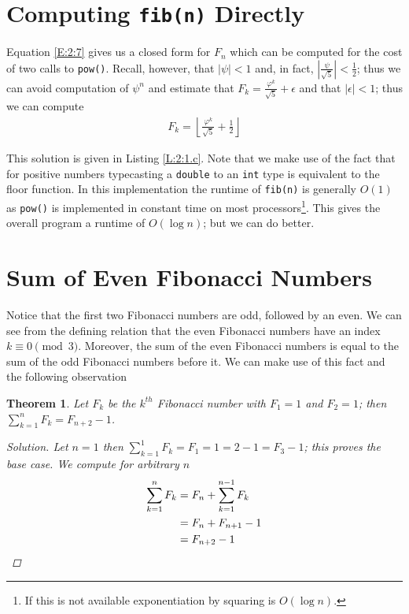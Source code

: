 \documentclass[oneside,12pt]{book}   	%
\newcounter{ex}
\newcounter{def}
\newcounter{pr}
\newtheorem{thm}{Theorem}[chapter]
\theoremstyle{definition}
\newcommand{\vaprhi}[0]{\varphi}
\newcommand{\floor}[1]{\left\lfloor #1 \right\rfloor}
\newcommand{\order}[1]{\left| #1 \right|}
\begin{document}
\begin{spacing}{1.618}
		\section{Computing \texttt{fib(n)} Directly}
		
			Equation \ref{E:2:7} gives us a closed form for $F_n$ which can be computed for the cost of two calls to \texttt{pow()}. Recall, however, that $\order{\psi}<1$ and, in fact, $\order{\frac{\psi}{\sqrt{5}}}<\frac{1}{2}$; thus we can avoid computation of $\psi^n$ and estimate that $F_k= \frac{\vaprhi^k}{\sqrt{5}}+\epsilon$ and that $\order{\epsilon}<1$; thus we can compute
			\begin{alignat}{4}
				F_k=\floor{\frac{\varphi^k}{\sqrt{5}}+\frac{1}{2}}
			\end{alignat}
			
			This solution is given in Listing \ref{L:2:1.c}. Note that we make use of the fact that for positive numbers typecasting a \texttt{double} to an \texttt{int} type is equivalent to the floor function. In this implementation the runtime of \texttt{fib(n)} is generally $O(1)$ as \texttt{pow()} is implemented in constant time on most processors\footnote{If this is not available exponentiation by squaring is $O(\log n)$.}. This gives the overall program a runtime of $O(\log n)$; but we can do better. 
		
	\section{Sum of Even Fibonacci Numbers}
	
		Notice that the first two Fibonacci numbers are odd, followed by an even. We can see from the defining relation that the even Fibonacci numbers have an index $k\equiv 0\pmod 3$. Moreover, the sum of the even Fibonacci numbers is equal to the sum of the odd Fibonacci numbers before it. We can make use of this fact and the following observation
		\begin{thm}
			Let $F_k$ be the $k^{th}$ Fibonacci number with $F_1=1$ and $F_2=1$; then $\sum_{k=1}^n F_k=F_{n+2}-1$. 
			\begin{proof}[Solution]
				Let $n=1$ then $\sum_{k=1}^1F_k=F_1=1=2-1=F_3-1$; this proves the base case. 
				We compute for arbitrary $n$
				\begin{alignat}{4}
					\sum_{k=1}^nF_k&=F_n + \sum_{k=1}^{n-1}F_k  \notag \\
						&= F_n + F_{n+1} -1 \notag \\
						&= F_{n+2}-1 \notag 
				\end{alignat}
			\end{proof}
		\end{thm}	
		

\end{spacing}
\end{document}

